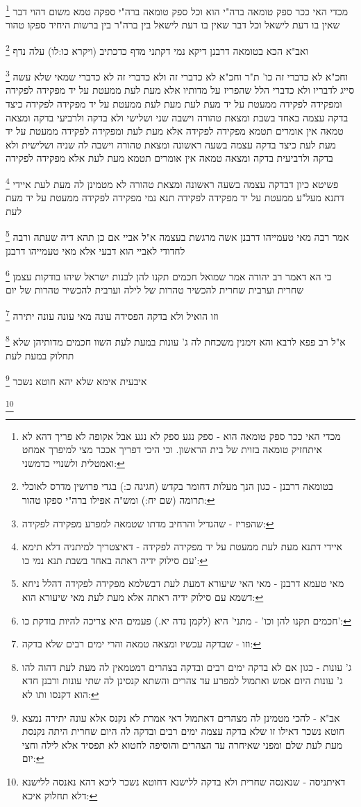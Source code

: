 \documentclass[12pt, openany]{book}
\newcommand{\footnotecomment}[1]{
	\renewcommand\thefootnote{}
	\footnote{#1}}
\newcommand{\commenta}[1]{\footnotecomment{#1}}
\begin{document}
{{\commenta{מכדי האי ככר ספק טומאה הוא - ספק נגע ספק לא נגע אבל אקופה לא פריך דהא לא איתחזיק טומאה בזוית של בית הראשון. וכי היכי דפריך אככר מצי למיפרך אמחט ואמטלית ולשנויי כדמשני:}
מכדי האי ככר ספק טומאה ברה"י הוא וכל ספק טומאה ברה"י ספקה טמא משום דהוי דבר שאין בו דעת לישאל וכל דבר שאין בו דעת לישאל בין ברה"ר בין ברשות היחיד ספקו טהור 
\commenta{בטומאה דרבנן - כגון הנך מעלות דחומר בקדש (חגיגה כ:) בגדי פרושין מדרס לאוכלי תרומה (שם יח:) ומש"ה אפילו ברה"י ספקו טהור:}
ואב"א הכא בטומאה דרבנן דיקא נמי דקתני מדף כדכתיב (ויקרא כו:לו) עלה נדף
\commenta{שהפריז - שהגדיל והרחיב מדתו שטמאה למפרע מפקידה לפקידה:}
וחכ"א לא כדברי זה כו' ת"ר וחכ"א לא כדברי זה ולא כדברי זה לא כדברי שמאי שלא עשה סייג לדבריו ולא כדברי הלל שהפריז על מדותיו 
אלא מעת לעת ממעטת על יד מפקידה לפקידה ומפקידה לפקידה ממעטת על יד מעת לעת 
מעת לעת ממעטת על יד מפקידה לפקידה כיצד בדקה עצמה באחד בשבת ומצאת טהורה וישבה שני ושלישי ולא בדקה ולרביעי בדקה ומצאה טמאה אין אומרים תטמא מפקידה לפקידה אלא מעת לעת 
ומפקידה לפקידה ממעטת על יד מעת לעת כיצד בדקה עצמה בשעה ראשונה ומצאת טהורה וישבה לה שניה ושלישית ולא בדקה ולרביעית בדקה ומצאה טמאה אין אומרים תטמא מעת לעת אלא מפקידה לפקידה 
\commenta{איידי דתנא מעת לעת ממעטת על יד מפקידה לפקידה - דאיצטריך למיתניה דלא תימא עם סילוק ידיה ראתה באחד בשבת תנא נמי כו':}
פשיטא כיון דבדקה עצמה בשעה ראשונה ומצאת טהורה לא מטמינן לה מעת לעת איידי דתנא מעל"ע ממעטת על יד מפקידה לפקידה תנא נמי מפקידה לפקידה ממעטת על יד מעת לעת 
\commenta{מאי טעמא דרבנן - מאי האי שיעורא דמעת לעת דבשלמא מפקידה לפקידה דהלל ניחא דשמא עם סילוק ידיה ראתה אלא מעת לעת מאי שיעורא הוא:}
אמר רבה מאי טעמייהו דרבנן אשה מרגשת בעצמה א"ל אביי אם כן תהא דיה שעתה ורבה לחדודי לאביי הוא דבעי אלא מאי טעמייהו דרבנן 
\commenta{חכמים תקנו להן וכו' - מתני' היא (לקמן נדה יא.) פעמים היא צריכה להיות בודקת כו':}
כי הא דאמר רב יהודה אמר שמואל חכמים תקנו להן לבנות ישראל שיהו בודקות עצמן שחרית וערבית שחרית להכשיר טהרות של לילה וערבית להכשיר טהרות של יום 
\commenta{וזו - שבדקה עכשיו ומצאה טמאה והרי ימים רבים שלא בדקה:}
וזו הואיל ולא בדקה הפסידה עונה מאי עונה עונה יתירה 
\commenta{ג' עונות - כגון אם לא בדקה ימים רבים ובדקה בצהרים דמטמאין לה מעת לעת דהוה להו ג' עונות היום אמש ואתמול למפרע עד צהרים והשתא קנסינן לה שתי עונות ורבנן חדא הוא דקנסו ותו לא:}
א"ל רב פפא לרבא והא זימנין משכחת לה ג' עונות במעת לעת השוו חכמים מדותיהן שלא תחלוק במעת לעת 
\commenta{אב"א - להכי מטמינן לה מצהרים דאתמול דאי אמרת לא נקנס אלא עונה יתירה נמצא חוטא נשכר דאילו זו שלא בדקה עצמה ימים רבים ובדקה לה היום שחרית היתה נקנסת מעת לעת שלם ומפני שאיחרה עד הצהרים והוסיפה לחטוא לא תפסיד אלא לילה וחצי יום:}
איבעית אימא שלא יהא חוטא נשכר 
\commenta{דאיתניסה - שנאנסה שחרית ולא בדקה ללישנא דחוטא נשכר ליכא דהא נאנסה ללישנא דלא תחלוק איכא:}
}}
\end{document}
